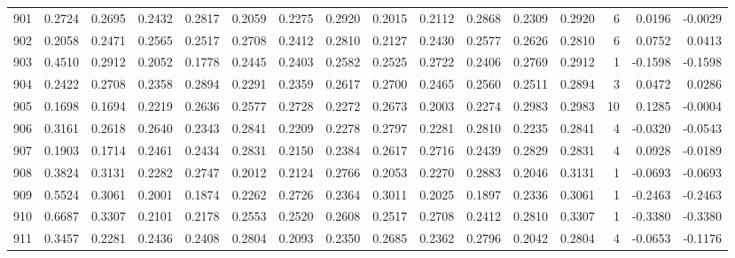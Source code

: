 \begin{tabular}{lrrrrrrrrrrrrrrr}
901 &      0.2724 &  0.2695 &  0.2432 &  0.2817 &  0.2059 &  0.2275 &  0.2920 &  0.2015 &  0.2112 &  0.2868 &   0.2309 &     0.2920 &      6 &                    0.0196 &                    -0.0029 \\
902 &      0.2058 &  0.2471 &  0.2565 &  0.2517 &  0.2708 &  0.2412 &  0.2810 &  0.2127 &  0.2430 &  0.2577 &   0.2626 &     0.2810 &      6 &                    0.0752 &                     0.0413 \\
903 &      0.4510 &  0.2912 &  0.2052 &  0.1778 &  0.2445 &  0.2403 &  0.2582 &  0.2525 &  0.2722 &  0.2406 &   0.2769 &     0.2912 &      1 &                   -0.1598 &                    -0.1598 \\
904 &      0.2422 &  0.2708 &  0.2358 &  0.2894 &  0.2291 &  0.2359 &  0.2617 &  0.2700 &  0.2465 &  0.2560 &   0.2511 &     0.2894 &      3 &                    0.0472 &                     0.0286 \\
905 &      0.1698 &  0.1694 &  0.2219 &  0.2636 &  0.2577 &  0.2728 &  0.2272 &  0.2673 &  0.2003 &  0.2274 &   0.2983 &     0.2983 &     10 &                    0.1285 &                    -0.0004 \\
906 &      0.3161 &  0.2618 &  0.2640 &  0.2343 &  0.2841 &  0.2209 &  0.2278 &  0.2797 &  0.2281 &  0.2810 &   0.2235 &     0.2841 &      4 &                   -0.0320 &                    -0.0543 \\
907 &      0.1903 &  0.1714 &  0.2461 &  0.2434 &  0.2831 &  0.2150 &  0.2384 &  0.2617 &  0.2716 &  0.2439 &   0.2829 &     0.2831 &      4 &                    0.0928 &                    -0.0189 \\
908 &      0.3824 &  0.3131 &  0.2282 &  0.2747 &  0.2012 &  0.2124 &  0.2766 &  0.2053 &  0.2270 &  0.2883 &   0.2046 &     0.3131 &      1 &                   -0.0693 &                    -0.0693 \\
909 &      0.5524 &  0.3061 &  0.2001 &  0.1874 &  0.2262 &  0.2726 &  0.2364 &  0.3011 &  0.2025 &  0.1897 &   0.2336 &     0.3061 &      1 &                   -0.2463 &                    -0.2463 \\
910 &      0.6687 &  0.3307 &  0.2101 &  0.2178 &  0.2553 &  0.2520 &  0.2608 &  0.2517 &  0.2708 &  0.2412 &   0.2810 &     0.3307 &      1 &                   -0.3380 &                    -0.3380 \\
911 &      0.3457 &  0.2281 &  0.2436 &  0.2408 &  0.2804 &  0.2093 &  0.2350 &  0.2685 &  0.2362 &  0.2796 &   0.2042 &     0.2804 &      4 &                   -0.0653 &                    -0.1176 \\

\end{tabular}
